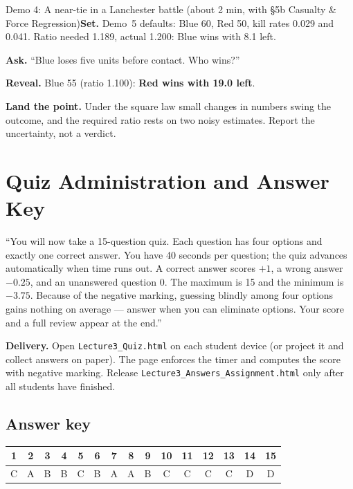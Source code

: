 \documentclass[11pt]{article}
\begin{document}
\begin{live}{Demo 4: A near-tie in a Lanchester battle (about 2 min, with \S5b Casualty \& Force Regression)}\textbf{Set.} Demo~5 defaults: Blue 60, Red 50, kill rates 0.029 and 0.041. Ratio needed 1.189, actual 1.200: Blue wins with 8.1 left.\par\smallskip\textbf{Ask.} ``Blue loses five units before contact. Who wins?''\par\smallskip\textbf{Reveal.} Blue 55 (ratio 1.100): \textbf{Red wins with 19.0 left}.\par\smallskip\textbf{Land the point.} Under the square law small changes in numbers swing the outcome, and the required ratio rests on two noisy estimates. Report the uncertainty, not a verdict.\end{live}

\section{Quiz Administration and Answer Key}

\begin{sayit}``You will now take a 15-question quiz. Each question has four options and exactly one correct answer. You have 40 seconds per question; the quiz advances automatically when time runs out. A correct answer scores $+1$, a wrong answer $-0.25$, and an unanswered question 0. The maximum is 15 and the minimum is $-3.75$. Because of the negative marking, guessing blindly among four options gains nothing on average --- answer when you can eliminate options. Your score and a full review appear at the end.''\end{sayit}

\textbf{Delivery.} Open \texttt{Lecture3\_Quiz.html} on each student device (or project it and collect answers on paper). The page enforces the timer and computes the score with negative marking. Release \texttt{Lecture3\_Answers\_Assignment.html} only after all students have finished.

\subsection*{Answer key}\begin{center}\small\renewcommand{\arraystretch}{1.3}\begin{tabular}{|c|c|c|c|c|c|c|c|c|c|c|c|c|c|c|}\hline \textbf{1} & \textbf{2} & \textbf{3} & \textbf{4} & \textbf{5} & \textbf{6} & \textbf{7} & \textbf{8} & \textbf{9} & \textbf{10} & \textbf{11} & \textbf{12} & \textbf{13} & \textbf{14} & \textbf{15}\\\hline C & A & B & B & C & B & A & A & B & C & C & C & C & D & D\\\hline\end{tabular}\end{center}
\end{document}

